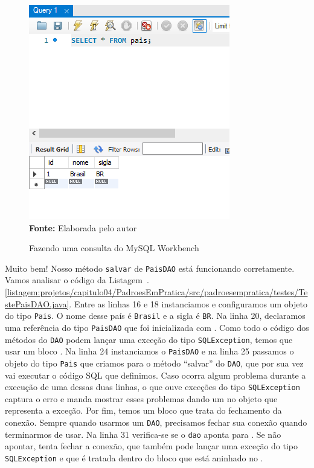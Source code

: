 \FloatBarrier
\begin{figure}[!htbp]
    \centering
    \caption{Fazendo uma consulta do MySQL Workbench}
    \includegraphics[scale=1]{imagens/cap04ExecucaoSelect}
    \\\textbf{Fonte:} Elaborada pelo autor
    \label{fig:cap04ExecucaoSelect}
\end{figure}
\FloatBarrier

Muito bem! Nosso método \texttt{salvar} de \texttt{PaisDAO} está funcionando corretamente. Vamos analisar o código da Listagem~\thechapter.\ref{listagem:projetos/capitulo04/PadroesEmPratica/src/padroesempratica/testes/TestePaisDAO.java}. Entre as linhas 16 e 18 instanciamos e configuramos um objeto do tipo \texttt{Pais}. O nome desse país é \texttt{Brasil} e a sigla é \texttt{BR}. Na linha 20, declaramos uma referência do tipo \texttt{PaisDAO} que foi inicializada com . Como todo o código dos métodos do \texttt{DAO} podem lançar uma exceção do tipo \texttt{SQLException}, temos que usar um bloco . Na linha 24 instanciamos o \texttt{PaisDAO} e na linha 25 passamos o objeto do tipo \texttt{Pais} que criamos para o método ``salvar'' do \texttt{DAO}, que por sua vez vai executar o código SQL que definimos. Caso ocorra algum problema durante a execução de uma dessas duas linhas, o  que ouve exceções do tipo \texttt{SQLException} captura o erro e manda mostrar esses problemas dando um  no objeto que representa a exceção. Por fim, temos um bloco  que trata do fechamento da conexão. Sempre quando usarmos um \texttt{DAO}, precisamos fechar sua conexão quando terminarmos de usar. Na linha 31 verifica-se se o \texttt{dao} aponta para . Se não apontar, tenta fechar a conexão, que também pode lançar uma exceção do tipo \texttt{SQLException} e que é tratada dentro do bloco  que está aninhado no .

